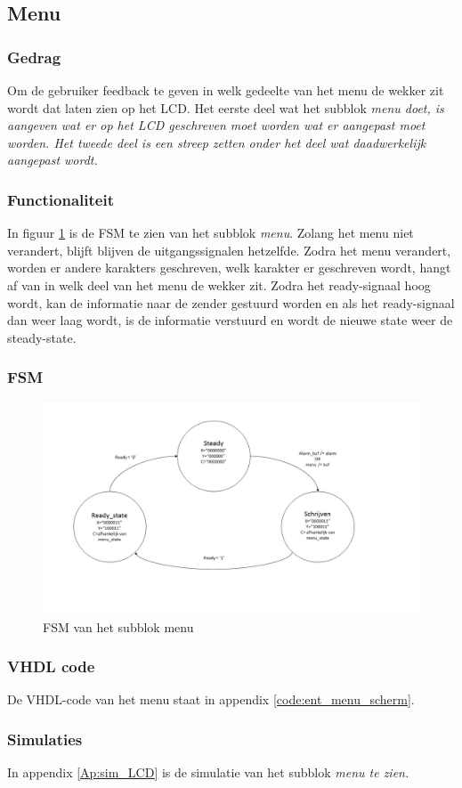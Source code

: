 \subsection{Menu}

\subsubsection{Gedrag}
Om de gebruiker feedback te geven in welk gedeelte van het menu de wekker zit wordt dat laten zien op het LCD. Het eerste deel wat het subblok \it{menu} doet, is aangeven wat er op het LCD geschreven moet worden wat er aangepast moet worden. Het tweede deel is een streep zetten onder het deel wat daadwerkelijk aangepast wordt.

\subsubsection{Functionaliteit}
In figuur \ref{fig:FSMmenu} is de FSM te zien van het subblok {\it menu}. Zolang het menu niet verandert, blijft blijven de uitgangssignalen hetzelfde. Zodra het menu verandert, worden er andere karakters geschreven, welk karakter er geschreven wordt, hangt af van in welk deel van het menu de wekker zit. Zodra het ready-signaal hoog wordt, kan de informatie naar de zender gestuurd worden en als het ready-signaal dan weer laag wordt, is de informatie verstuurd en wordt de nieuwe state weer de steady-state.

\subsubsection{FSM}

\begin{figure}[h!]
\includegraphics[width=15cm]{verslagschemas/FSMs/menu.jpg}
\caption{FSM van het subblok menu}
\label{fig:FSMmenu}
\end{figure}


\subsubsection{VHDL code}
De VHDL-code van het menu staat in appendix \ref{code:ent_menu_scherm}.

\subsubsection{Simulaties}
In appendix \ref{Ap:sim_LCD} is de simulatie van het subblok \it{menu} te zien.
